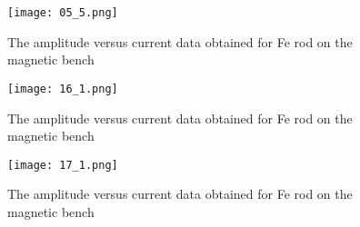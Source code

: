 \begin{figure}[H]
	\centering
	\texttt{[image: 05\_5.png]}
	\caption{The amplitude versus current data obtained for Fe rod on the magnetic bench}
	\label{fig:mb-fe-0}
\end{figure}
\begin{figure}[H]
	\centering
	\texttt{[image: 16\_1.png]}
	\caption{The amplitude versus current data obtained for Fe rod on the magnetic bench}
	\label{fig:mb-fe-0}
\end{figure}
\begin{figure}[H]
	\centering
	\texttt{[image: 17\_1.png]}
	\caption{The amplitude versus current data obtained for Fe rod on the magnetic bench}
	\label{fig:mb-fe-0}
\end{figure}
\setcounter{equation}{0}
\setcounter{table}{0}
\setcounter{figure}{0}